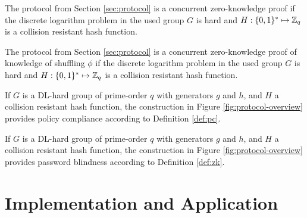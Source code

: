 \begin{lemma}\label{lem:pom}
  The \PoM protocol from Section \ref{sec:protocol} is a concurrent zero-knowledge proof if the discrete logarithm problem in the used group $G$ is hard and $H:\{0,1\}^\ast\mapsto\mathbb{Z}_q$ is a collision resistant hash function.
\end{lemma}

\begin{lemma}\label{lem:pos}
  The \PoS protocol from Section \ref{sec:protocol} is a concurrent zero-knowledge proof of knowledge of shuffling $\phi$ if the discrete logarithm problem in the used group $G$ is hard and $H:\{0,1\}^\ast\mapsto\mathbb{Z}_q$ is a collision resistant hash function.
\end{lemma}


\begin{theorem}\label{theo:pc}
  If $G$ is a DL-hard group of prime-order $q$ with generators $g$ and $h$, and $H$ a collision resistant hash function, the construction in Figure \ref{fig:protocol-overview} provides policy compliance according to Definition \ref{def:pc}.
\end{theorem}

%
\begin{theorem}\label{theo:zk}
  If $G$ is a DL-hard group of prime-order $q$ with generators $g$ and $h$, and $H$ a collision resistant hash function, the construction in Figure \ref{fig:protocol-overview} provides password blindness according to Definition \ref{def:zk}.
\end{theorem}


\section{Implementation and Application}

